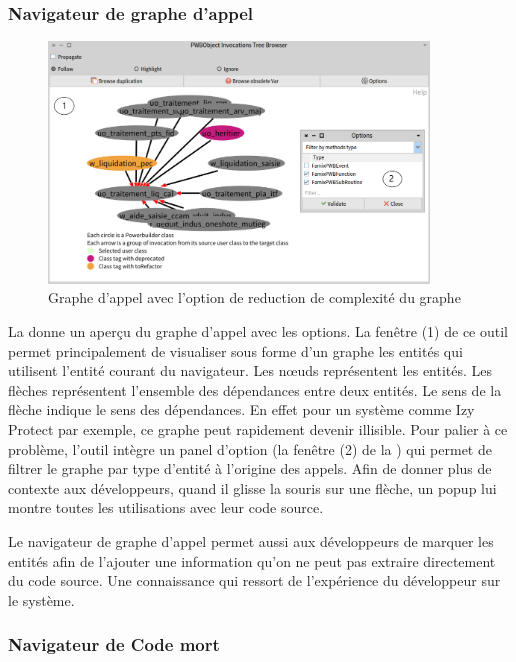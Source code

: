 \documentclass[a4paper]{article}
\begin{document}
\subsubsection{Navigateur de graphe d'appel}

\begin{figure}[htbp]
  \begin{center}
  \includegraphics[width=0.9\textwidth]{./figures/callGraphBrowser.png}
  \caption{Graphe d'appel avec l'option de reduction de complexité du graphe}
  \label{fig:graphAppel}
\end{center}
\vspace{-0.3cm}
\end{figure}
La  donne un aperçu du graphe d'appel avec les options.  
La fenêtre (1) de ce outil permet principalement de visualiser sous forme d'un graphe les entités qui utilisent l'entité courant du navigateur.
Les nœuds représentent les entités. Les flèches représentent l'ensemble des dépendances entre deux entités.
Le sens de la flèche indique le sens des dépendances.
En effet pour un système comme Izy Protect par exemple, ce graphe peut rapidement devenir illisible. 
Pour palier à ce problème, l'outil intègre un panel d'option (la fenêtre (2) de la ) qui permet de filtrer le graphe par type d'entité à l'origine des appels.
Afin de donner plus de contexte aux développeurs, quand il glisse la souris sur une flèche, un popup lui montre toutes les utilisations avec leur code source.

Le navigateur de graphe d'appel permet aussi aux développeurs de marquer les entités afin de l'ajouter une information qu'on ne peut pas extraire directement du code source.
Une connaissance qui ressort de l'expérience du développeur sur le système.

\subsubsection{Navigateur de Code mort}
\end{document}
